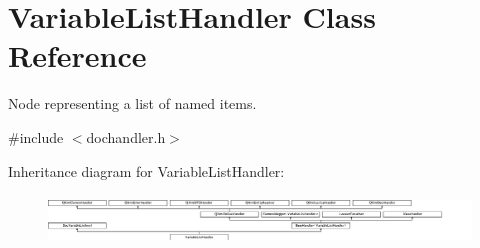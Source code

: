 \hypertarget{class_variable_list_handler}{}\section{Variable\+List\+Handler Class Reference}
\label{class_variable_list_handler}


Node representing a list of named items.  




{\ttfamily \#include $<$dochandler.\+h$>$}

Inheritance diagram for Variable\+List\+Handler\+:\begin{figure}[H]
\begin{center}
\leavevmode
\includegraphics[height=1.311475cm]{class_variable_list_handler}
\end{center}
\end{figure}
